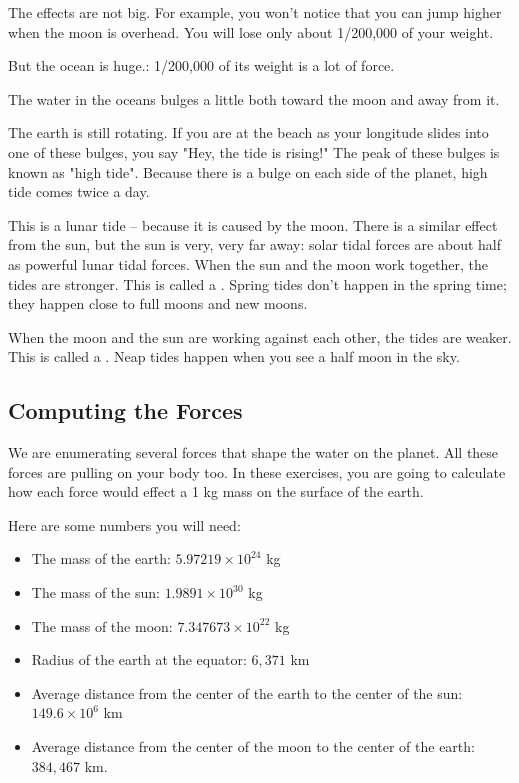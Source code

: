 The effects are not big.  For example,  you won't notice that you can jump higher when the moon is 
overhead.  You will lose only about 1/200,000 of your weight.

But the ocean is huge.: 1/200,000 of its weight is a lot of force.

The water in the oceans bulges a little both toward the moon and away from it.

The earth is still rotating.  If you are at the beach as your longitude slides into one of these bulges,   you say "Hey, the tide is rising!"  The peak of these bulges is known as "high tide".  Because there is a bulge on each 
side of the planet,  high tide comes twice a day.

This is a lunar tide -- because it is caused by the moon.  There is a similar effect from the sun,  but the sun is very, very far away: solar tidal forces are about half as powerful lunar tidal forces.  When the sun and the moon work together,   the tides are stronger.  This is called a .   Spring tides don't happen in the spring time;  they happen close to full moons and new moons.

When the moon and the sun are working against each other,  the tides are weaker.  This is called a .  Neap tides happen when you see a half moon in the sky.

\subsection{Computing the Forces}

We are enumerating several forces that shape the water on the planet.  All these forces are pulling on your
body too.  In these exercises, you are going to calculate how each force would effect a 1 kg mass on the surface of the earth.

Here are some numbers you will need:
\begin{itemize}
\item The mass of the earth: $5.97219 \times 10^{24}$ kg
\item The mass of the sun:  $1.9891 \times 10^{30}$ kg
\item The mass of the moon: $7.347673 \times 10^{22}$ kg
\item Radius of the earth at the equator: $6,371$ km
\item Average distance from the center of the earth to the center of the sun:  $149.6 \times 10^6$ km
\item Average distance from the center of the moon to the center of the earth: $384,467$ km.
\end{itemize}


